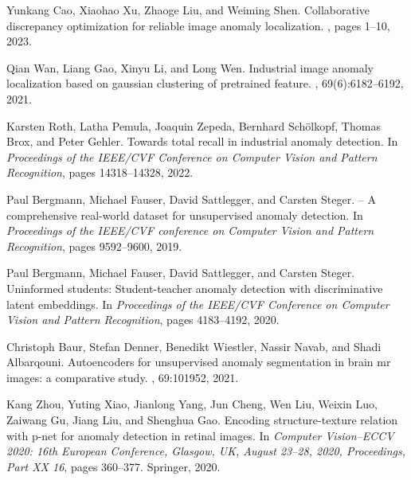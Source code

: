 {\small

\begin{thebibliography}{10}

Yunkang Cao, Xiaohao Xu, Zhaoge Liu, and Weiming Shen.
\newblock Collaborative discrepancy optimization for reliable image anomaly
  localization.
, pages 1--10, 2023.

Qian Wan, Liang Gao, Xinyu Li, and Long Wen.
\newblock Industrial image anomaly localization based on gaussian clustering of
  pretrained feature.
, 69(6):6182--6192,
  2021.

Karsten Roth, Latha Pemula, Joaquin Zepeda, Bernhard Sch{\"o}lkopf, Thomas
  Brox, and Peter Gehler.
\newblock Towards total recall in industrial anomaly detection.
\newblock In {\em Proceedings of the IEEE/CVF Conference on Computer Vision and
  Pattern Recognition}, pages 14318--14328, 2022.

Paul Bergmann, Michael Fauser, David Sattlegger, and Carsten Steger.
 -- {A} comprehensive real-world dataset for unsupervised
  anomaly detection.
\newblock In {\em Proceedings of the IEEE/CVF conference on Computer Vision and
  Pattern Recognition}, pages 9592--9600, 2019.

Paul Bergmann, Michael Fauser, David Sattlegger, and Carsten Steger.
\newblock Uninformed students: Student-teacher anomaly detection with
  discriminative latent embeddings.
\newblock In {\em Proceedings of the IEEE/CVF Conference on Computer Vision and
  Pattern Recognition}, pages 4183--4192, 2020.

Christoph Baur, Stefan Denner, Benedikt Wiestler, Nassir Navab, and Shadi
  Albarqouni.
\newblock Autoencoders for unsupervised anomaly segmentation in brain mr
  images: a comparative study.
, 69:101952, 2021.

Kang Zhou, Yuting Xiao, Jianlong Yang, Jun Cheng, Wen Liu, Weixin Luo, Zaiwang
  Gu, Jiang Liu, and Shenghua Gao.
\newblock Encoding structure-texture relation with p-net for anomaly detection
  in retinal images.
\newblock In {\em Computer Vision--ECCV 2020: 16th European Conference,
  Glasgow, UK, August 23--28, 2020, Proceedings, Part XX 16}, pages 360--377.
  Springer, 2020.


\end{thebibliography}}
